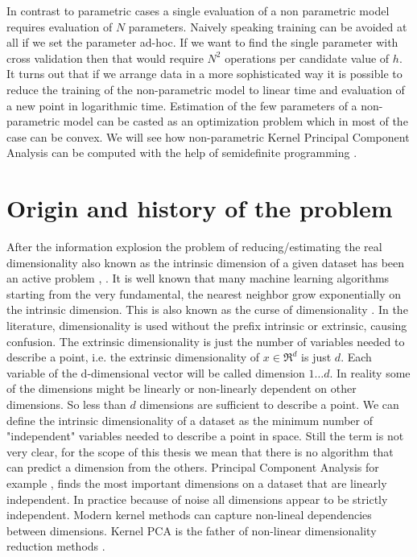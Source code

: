 \documentclass[12pt,letterpaper,doublespaced,ETD,dvips,proposal]{gtthesis}
\begin{document}
\begin{Body}

In contrast to parametric cases a single evaluation of a non
parametric model requires evaluation of $N$ parameters. Naively
speaking training can be avoided at all if we set the parameter
ad-hoc. If we want to find the single parameter with cross
validation then that would require $N^2$ operations per candidate
value of $h$. It turns out that if we arrange data in a more sophisticated way
it is possible to reduce the training of the non-parametric model to
linear time and evaluation of a new point in logarithmic time.
Estimation of the few parameters of a non-parametric model can be
casted as an optimization problem which in most of the case can be
convex. We will see how non-parametric Kernel Principal Component 
Analysis \cite{scholkopf1998nca} can be computed with the help 
of semidefinite programming \cite{vandenberghe1996sp, boyd2004co}.

\section{Origin and history of the problem}
\label{origin}

After the information explosion the problem of reducing/estimating
the real dimensionality also known as the intrinsic dimension of a
given dataset has been an active problem \cite{kegl2003ide}, \cite{costa2003egm}. 
It is well known that many
machine learning algorithms starting from the very fundamental, the
nearest neighbor grow exponentially on the intrinsic dimension. This
is also known as the curse of dimensionality \cite{donoho2000hdd}.
In the literature, dimensionality is used without the prefix intrinsic or
extrinsic, causing confusion. The extrinsic dimensionality is just
the number of variables needed to describe a point, i.e. the
extrinsic dimensionality of $x\in \Re^d$ is just $d$. Each variable
of the d-dimensional vector will be called dimension $1\dots d$. In
reality some of the dimensions might be linearly or non-linearly
dependent on other dimensions. So less than $d$ dimensions are
sufficient to describe a point. We can define the intrinsic
dimensionality of a dataset as the minimum number of "independent"
variables needed to describe a point in space. Still the term is not
very clear, for the scope of this thesis we mean that there is no
algorithm that can predict a dimension from the others. Principal
Component Analysis for example \cite{jolliffe2002pca}, finds the most important dimensions
on a dataset that are linearly independent. In practice because of
noise all dimensions appear to be strictly independent.  Modern
kernel methods can capture non-lineal dependencies between
dimensions. Kernel PCA is the father of non-linear dimensionality
reduction methods \cite{scholkopf2002lks}.


\end{Body}
\end{document}
